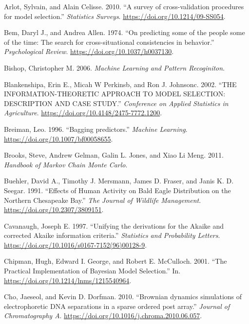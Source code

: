 \documentclass[]{article}
\begin{document}
\leavevmode\hypertarget{ref-Arlot2010}{}%
Arlot, Sylvain, and Alain Celisse. 2010. ``A survey of cross-validation
procedures for model selection.'' \emph{Statistics Surveys}.
\url{https://doi.org/10.1214/09-SS054}.

\leavevmode\hypertarget{ref-Bem1974}{}%
Bem, Daryl J., and Andrea Allen. 1974. ``On predicting some of the
people some of the time: The search for cross-situational consistencies
in behavior.'' \emph{Psychological Review}.
\url{https://doi.org/10.1037/h0037130}.

\leavevmode\hypertarget{ref-Bishop2006}{}%
Bishop, Christopher M. 2006. \emph{Machine Learning and Pattern
Recoginiton}.

\leavevmode\hypertarget{ref-Blankenshipa2002}{}%
Blankenshipa, Erin E., Micah W Perkinsb, and Ron J. Johnsonc. 2002.
``THE INFORMATION-THEORETIC APPROACH TO MODEL SELECTION: DESCRIPTION AND
CASE STUDY.'' \emph{Conference on Applied Statistics in Agriculture}.
\url{https://doi.org/10.4148/2475-7772.1200}.

\leavevmode\hypertarget{ref-Breiman1996}{}%
Breiman, Leo. 1996. ``Bagging predictors.'' \emph{Machine Learning}.
\url{https://doi.org/10.1007/bf00058655}.

\leavevmode\hypertarget{ref-Brooks2011}{}%
Brooks, Steve, Andrew Gelman, Galin L. Jones, and Xiao Li Meng. 2011.
\emph{Handbook of Markov Chain Monte Carlo}.

\leavevmode\hypertarget{ref-Buehler1991}{}%
Buehler, David A., Timothy J. Mersmann, James D. Fraser, and Janis K. D.
Seegar. 1991. ``Effects of Human Activity on Bald Eagle Distribution on
the Northern Chesapeake Bay.'' \emph{The Journal of Wildlife
Management}. \url{https://doi.org/10.2307/3809151}.

\leavevmode\hypertarget{ref-Cavanaugh1997}{}%
Cavanaugh, Joseph E. 1997. ``Unifying the derivations for the Akaike and
corrected Akaike information criteria.'' \emph{Statistics and
Probability Letters}.
\url{https://doi.org/10.1016/s0167-7152(96)00128-9}.

\leavevmode\hypertarget{ref-Chipman2001}{}%
Chipman, Hugh, Edward I. George, and Robert E. McCulloch. 2001. ``The
Practical Implementation of Bayesian Model Selection.'' In.
\url{https://doi.org/10.1214/lnms/1215540964}.

\leavevmode\hypertarget{ref-Cho2010}{}%
Cho, Jaeseol, and Kevin D. Dorfman. 2010. ``Brownian dynamics
simulations of electrophoretic DNA separations in a sparse ordered post
array.'' \emph{Journal of Chromatography A}.
\url{https://doi.org/10.1016/j.chroma.2010.06.057}.
\end{document}
